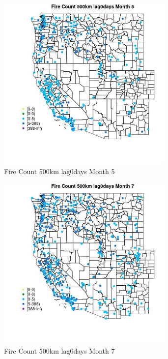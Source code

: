 \begin{figure} 
\centering  
\includegraphics[width=0.77\textwidth]{Code_Outputs/Report_ML_input_PM25_Step4_part_e_de_duplicated_aves_compiled_2019-05-18wNAs_MapObsMo5Fire_Count_500km_lag0days.jpg} 
\caption{\label{fig:Report_ML_input_PM25_Step4_part_e_de_duplicated_aves_compiled_2019-05-18wNAsMapObsMo5Fire_Count_500km_lag0days}Fire Count 500km lag0days Month 5} 
\end{figure} 
 

\begin{figure} 
\centering  
\includegraphics[width=0.77\textwidth]{Code_Outputs/Report_ML_input_PM25_Step4_part_e_de_duplicated_aves_compiled_2019-05-18wNAs_MapObsMo7Fire_Count_500km_lag0days.jpg} 
\caption{\label{fig:Report_ML_input_PM25_Step4_part_e_de_duplicated_aves_compiled_2019-05-18wNAsMapObsMo7Fire_Count_500km_lag0days}Fire Count 500km lag0days Month 7} 
\end{figure} 
 

